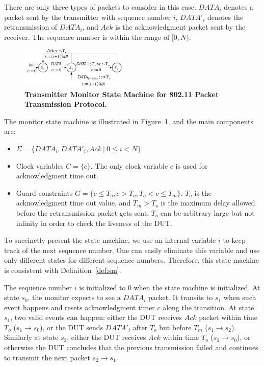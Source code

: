 There are only three types of packets to consider in this case: $DATA_i$ denotes
a packet sent by the transmitter with sequence number $i$, $DATA'_i$ denotes the
retransmission of $DATA_i$, and $Ack$ is the acknowledgment packet sent by the
receiver.
%
The sequence number is within the range of $[0, N)$.

\begin{figure}[t!]
  \centering
  \includegraphics[width=0.45\textwidth]{./figures/dot11_tx_ta.pdf}
  \caption{\textbf{Transmitter Monitor State Machine for 802.11 Packet Transmission
  Protocol.}}
  \label{fig:dot11_tx_ta}
\end{figure}



The monitor state machine is illustrated in Figure~\ref{fig:dot11_tx_ta}, and
the main components are:

\begin{itemize}
  \item $\Sigma = \{DATA_i, DATA'_i, Ack\ |\ 0 \le i < N\}$.
  \item Clock variables $C = \{c\}$. The only clock variable $c$ is
    used for acknowledgment time out.
  \item Guard constraints $G = \{ c \le T_o, c > T_o, T_o < c \le T_m\}$.
    $T_o$ is the acknowledgment time out value, and $T_m >
    T_o$ is the maximum delay allowed before the retransmission packet gets
    sent. $T_o$ can be arbitrary large but not infinity in order to check the
    liveness of the DUT.
\end{itemize}

To succinctly present the state machine, we use an internal variable $i$ to keep
track of the next sequence number.
%
One can easily eliminate this variable and
use only different states for different sequence numbers.
%
Therefore, this state machine is consistent with Definition~\ref{def:sm}.

The sequence number $i$ is initialized to 0 when the state machine is
initialized.
%
At state $s_0$, the monitor expects to see a $DATA_i$ packet.
%
It transits to $s_1$ when such event happens and resets acknowledgment timer $c$ along the transition.
%
At state $s_1$, two valid events can happen: either the DUT receives $Ack$ packet
within time $T_o$ ($s_1\rightarrow s_0$), or the DUT sends $DATA'_i$ after $T_o$
but before $T_m$ ($s_1 \rightarrow s_2$).
%
Similarly at state $s_2$, either the DUT receives $Ack$ within time $T_o$ ($s_2
\rightarrow s_0$), or otherwise the DUT concludes that the previous transmission
failed and continues to transmit the next packet $s_2\rightarrow s_1$.

